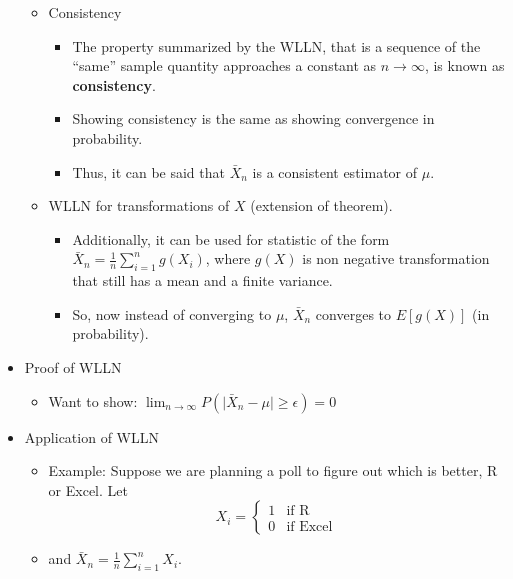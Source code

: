 \documentclass{article}
\begin{document}
\begin{itemize}
\begin{itemize}
\begin{itemize}
        \end{itemize}\bigskip
        \item Consistency
        \begin{itemize}
            \item The property summarized by the WLLN, that is a sequence of the ``same'' sample quantity approaches a constant as $n \to \infty$, is known as \textbf{consistency}.
            \item Showing consistency is the same as showing convergence in probability.
            \item[] Thus, it can be said that $\bar{X}_n$ is a consistent estimator of $\mu$.\hl{}
        \end{itemize}\bigskip\newpage
        \item WLLN for transformations of $X$ (extension of theorem).
        \begin{itemize}
            \item Additionally, it can be used for statistic of the form $\displaystyle \bar{X}_n = \frac{1}{n} \sum_{i=1}^n g(X_i)$, where $g(X)$ is non negative transformation that still has a mean and a finite variance.
            \item So, now instead of converging to $\mu$, $\bar{X}_n$ converges to $E[g(X)]$ (in probability).
        \end{itemize}\bigskip
    \end{itemize}
    \item Proof of WLLN
    \begin{itemize}
        \item Want to show: $\displaystyle \lim_{n \to \infty} P(\lvert \bar{X}_n - \mu \rvert \ge \epsilon) = 0$\vspace{200pt}
    \end{itemize}
    \item Application of WLLN
    \begin{itemize}
        \item Example: Suppose we are planning a poll to figure out which is better, R or Excel. Let
        \[
        X_i =
            \left\{
            \begin{array}{ll}
                 1 & \text{if R}\\
                 0 & \text{if Excel}
            \end{array}
            \right.
        \]
        \item[] and $\bar{X}_n = \frac{1}{n}\sum_{i=1}^n X_i$.
        \begin{enumerate}

\end{enumerate}
\end{itemize}
\end{itemize}
\end{document}
